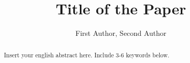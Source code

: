 \documentclass[12pt]{llncs}
\begin{document}
\begin{english}
\title{Title of the Paper}
\author{First Author,
Second Author}

\maketitle

\begin{abstract}
Insert your english abstract here. Include 3-6 keywords below.

\end{abstract}
\end{english}
\end{document}
